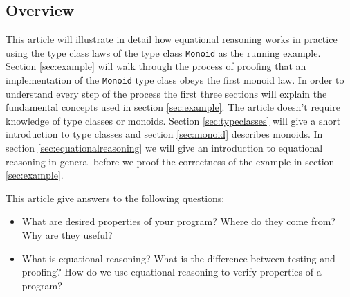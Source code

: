 \subsection{Overview}

This article will illustrate in detail how equational reasoning works in practice using the type class laws of the type class \verb|Monoid| as the running example. Section \ref{sec:example} will walk through the process of proofing that an implementation of the \verb|Monoid| type class obeys the first monoid law.  In order to understand every step of the process the first three sections will explain the fundamental concepts used in section \ref{sec:example}. The article doesn't require knowledge of type classes or \glspl{monoid}. 
Section \ref{sec:typeclasses} will give a short introduction to type classes and section \ref{sec:monoid} describes monoids. In section \ref{sec:equationalreasoning} we will give an introduction to equational reasoning in general before we proof the correctness of the example in section \ref{sec:example}.

This article give answers to the following questions:
\begin{itemize}
\item What are desired properties of your program? Where do they come from? Why are they useful?
\item What is equational reasoning? What is the difference between testing and proofing? How do we use equational reasoning to verify properties of a program?
\end{itemize}

